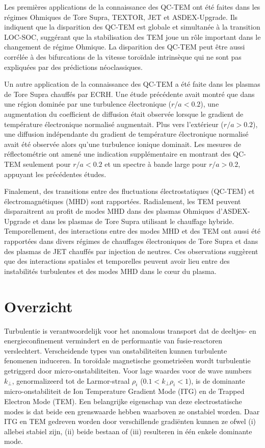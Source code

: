 Les premières applications de la connaissance des QC-TEM ont été faites dans les régimes Ohmiques de Tore Supra, TEXTOR, JET et ASDEX-Upgrade. Ils indiquent que la disparition des QC-TEM est globale et simultanée à la transition LOC-SOC, suggérant que la stabilisation des TEM joue un rôle important dans le changement de régime Ohmique. La disparition des QC-TEM peut être aussi corrélée à des bifurcations de la vitesse toroïdale intrinsèque qui ne sont pas expliquées par des prédictions néoclassiques.

Un autre application de la connaissance des QC-TEM a été faite dans les plasmas de Tore Supra chauffés par ECRH. Une étude précédente avait montré que dans une région dominée par une turbulence électronique ($r/a<0.2$), une augmentation du coefficient de diffusion était observée lorsque le gradient de température électronique normalisé augmentait. Plus vers l’extérieur ($r/a>0.2$), une diffusion indépendante du gradient de température électronique normalisé avait été observée alors qu’une turbulence ionique dominait. Les mesures de réflectométrie ont amené une indication supplémentaire en montrant des QC-TEM seulement pour $r/a<0.2$ et un spectre à bande large pour $r/a>0.2$, appuyant les précédentes études.

Finalement, des transitions entre des fluctuations électrostatiques (QC-TEM) et électromagnétiques (MHD) sont rapportées.
Radialement, les TEM peuvent disparaitrent au profit de modes MHD dans des plasmas Ohmiques d’ASDEX-Upgrade et dans les plasmas de Tore Supra utilisant le chauffage hybride. Temporellement, des interactions entre des modes MHD et des TEM ont aussi été rapportées dans divers régimes de chauffages électroniques de Tore Supra et dans des plasmas de JET chauffés par injection de neutres. Ces observations suggèrent que des interactions spatiales et temporelles peuvent avoir lieu entre des instabilités turbulentes et des modes MHD dans le cœur du plasma.




\section*{Overzicht}

Turbulentie is verantwoordelijk voor het anomalous transport dat de deeltjes- en energieconfinement vermindert en de performantie van fusie-reactoren verslechtert. Verscheidende types van onstabiliteiten kunnen turbulente fenomenen induceren. In toroïdale magnetische geometrieëen wordt turbulentie getriggerd door micro-onstabiliteiten. Voor lage waardes voor de wave numbers $k_{\perp}$, genormalizeerd tot de Larmor-straal $\rho_i$ ($0.1<k_{\perp}\rho_i<1$), is de dominante micro-onstabiliteit de Ion Temperature Gradient Mode (ITG) en de Trapped Electron Mode (TEM). Een belangrijke eigenschap van deze electrostatische modes is dat beide een grenswaarde hebben waarboven ze onstabiel worden. Daar ITG en TEM gedreven worden door verschillende gradiënten kunnen ze ofwel (i) allebei stabiel zijn, (ii) beide bestaan of (iii) resulteren in één enkele dominante mode.

